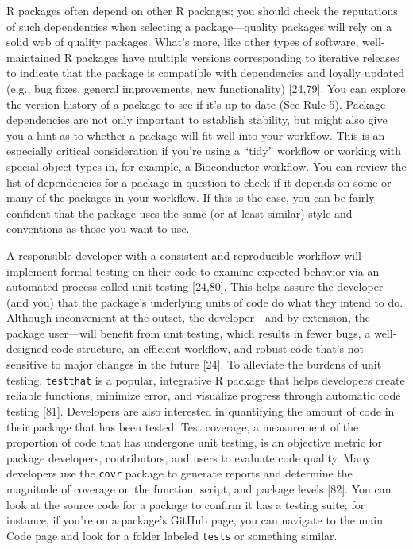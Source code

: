 \documentclass[10pt,letterpaper]{article}
\begin{document}
R packages often depend on other R packages; you should check the
reputations of such dependencies when selecting a package---quality
packages will rely on a solid web of quality packages. What's more, like
other types of software, well-maintained R packages have multiple
versions corresponding to iterative releases to indicate that the
package is compatible with dependencies and loyally updated (e.g., bug
fixes, general improvements, new functionality) {[}24,79{]}. You can
explore the version history of a package to see if it's up-to-date (See
Rule 5). Package dependencies are not only important to establish
stability, but might also give you a hint as to whether a package will
fit well into your workflow. This is an especially critical
consideration if you're using a ``tidy'' workflow or working with
special object types in, for example, a Bioconductor workflow. You can
review the list of dependencies for a package in question to check if it
depends on some or many of the packages in your workflow. If this is the
case, you can be fairly confident that the package uses the same (or at
least similar) style and conventions as those you want to use.

A responsible developer with a consistent and reproducible workflow will
implement formal testing on their code to examine expected behavior via
an automated process called unit testing {[}24,80{]}. This helps assure
the developer (and you) that the package's underlying units of code do
what they intend to do. Although inconvenient at the outset, the
developer---and by extension, the package user---will benefit from unit
testing, which results in fewer bugs, a well-designed code structure, an
efficient workflow, and robust code that's not sensitive to major
changes in the future {[}24{]}. To alleviate the burdens of unit
testing, \texttt{testthat} is a popular, integrative R package that
helps developers create reliable functions, minimize error, and
visualize progress through automatic code testing {[}81{]}. Developers
are also interested in quantifying the amount of code in their package
that has been tested. Test coverage, a measurement of the proportion of
code that has undergone unit testing, is an objective metric for package
developers, contributors, and users to evaluate code quality. Many
developers use the \texttt{covr} package to generate reports and
determine the magnitude of coverage on the function, script, and package
levels {[}82{]}. You can look at the source code for a package to
confirm it has a testing suite; for instance, if you're on a package's
GitHub page, you can navigate to the main Code page and look for a
folder labeled \texttt{tests} or something similar.
\end{document}

